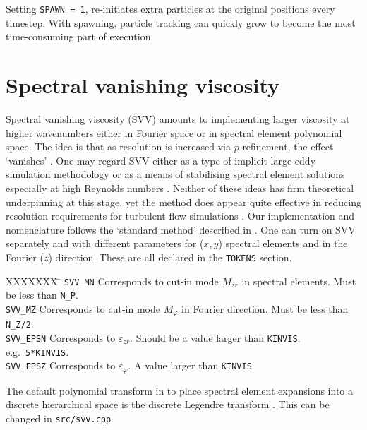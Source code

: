 \documentclass[11pt]{report}
\newcommand{\eg}{e.g.\ } \newcommand{\CC}{\mathrm{c.c.}}
\begin{document}
Setting \verb+SPAWN = 1+, re-initiates extra particles at the original
positions every timestep.  With spawning, particle tracking can
quickly grow to become the most time-consuming part of execution.

\section{Spectral vanishing viscosity}
\label{sec.svv}

Spectral vanishing viscosity (SVV) amounts to implementing larger
viscosity at higher wavenumbers either in Fourier space or in spectral
element polynomial space.  The idea is that as resolution is increased
via $p$-refinement, the effect `vanishes' \citep{tadmor89,mot93}.  One
may regard SVV either as a type of implicit large-eddy simulation
methodology \citep{pasquetti06} or as a means of stabilising spectral
element solutions especially at high Reynolds numbers
\citep{xupa04,kish06}. Neither of these ideas has firm theoretical
underpinning at this stage, yet the method does appear quite effective
in reducing resolution requirements for turbulent flow simulations
\citep{ksb12,cnbmo15}.  Our implementation and nomenclature follows
the `standard method' described in \citet{ksb12}.  One can turn on SVV
separately and with different parameters for ($x$,\,$y$) spectral
elements and in the Fourier ($z$) direction.  These are all declared
in the \verb+TOKENS+ section.

\begin{tabbing}
XXXXXXX \= \kill
\texttt{SVV\_MN} \> Corresponds to cut-in mode $M_{zr}$ in 
spectral elements. Must be less than \texttt{N\_P}.\\ 
%
\texttt{SVV\_MZ} \> Corresponds to cut-in mode $M_\varphi$ in 
Fourier direction. Must be less than \texttt{N\_Z/2}.\\
%
\texttt{SVV\_EPSN} \> Corresponds to $\varepsilon_{zr}$. 
Should be a value larger than \texttt{KINVIS}, \eg \texttt{5*KINVIS}.\\
%
\texttt{SVV\_EPSZ} \> Corresponds to $\varepsilon_\varphi$. 
A value larger than \texttt{KINVIS}.
\end{tabbing}

The default polynomial transform in to place spectral element
expansions into a discrete hierarchical space is the discrete Legendre
transform \citep[see e.g.][]{blsc03}. This can be changed in
\verb|src/svv.cpp|.
\end{document}
